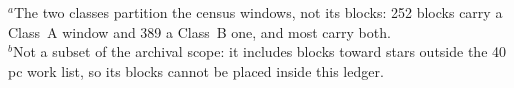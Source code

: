{\footnotesize $^{a}$The two classes partition the census windows, not its blocks: 252 blocks carry a Class~A window and 389 a Class~B one, and most carry both.\\ $^{b}$Not a subset of the archival scope: it includes blocks toward stars outside the 40\,pc work list, so its blocks cannot be placed inside this ledger.}
